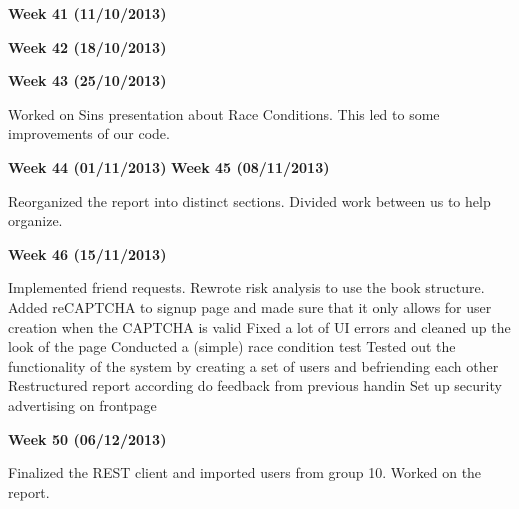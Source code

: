 \textbf{Week 41 (11/10/2013)}


\textbf{Week 42 (18/10/2013)}


\textbf{Week 43 (25/10/2013)}

Worked on Sins presentation about Race Conditions. This led to some improvements of our code.

\textbf{Week 44 (01/11/2013)}
\textbf{Week 45 (08/11/2013)}

Reorganized the report into distinct sections.
Divided work between us to help organize.

\textbf{Week 46 (15/11/2013)}

Implemented friend requests.
Rewrote risk analysis to use the book structure.
Added reCAPTCHA to signup page and made sure that it only allows for user creation when the CAPTCHA is valid
Fixed a lot of UI errors and cleaned up the look of the page
Conducted a (simple) race condition test
Tested out the functionality of the system by creating a set of users and befriending each other
Restructured report according do feedback from previous handin
Set up security advertising on frontpage

\textbf{Week 50 (06/12/2013)}

Finalized the REST client and imported users from group 10. Worked on the report.

